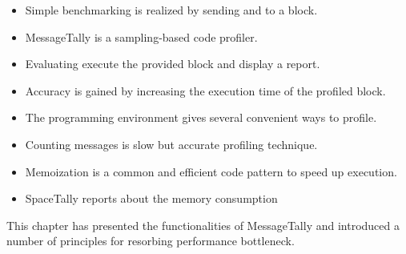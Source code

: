 \documentclass[a4paper,10pt,twoside]{book}
\begin{document}
\begin{itemize}
\item Simple benchmarking is realized by sending  and  to a block.
\item MessageTally is a sampling-based code profiler.
\item Evaluating  execute the provided block and display a report.
\item Accuracy is gained by increasing the execution time of the profiled block.
\item The \pharo programming environment gives several convenient ways to profile.
\item Counting messages is slow but accurate profiling technique.
\item Memoization is a common and efficient code pattern to speed up execution.
\item SpaceTally reports about the memory consumption
\end{itemize}

This chapter has presented the functionalities of MessageTally and introduced a number of principles for resorbing performance bottleneck. 



\ifx\wholebook\relax\else
\end{document}
